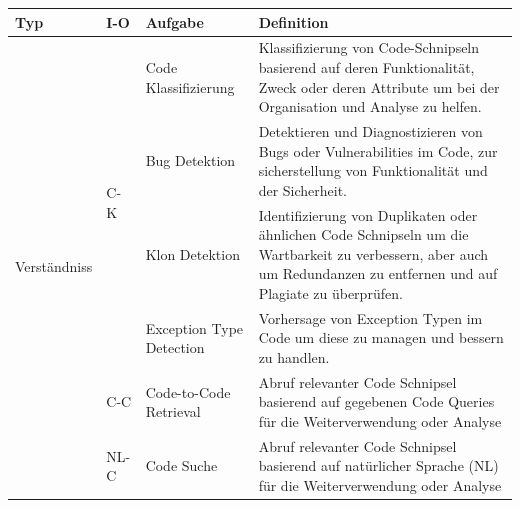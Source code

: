 \begin{table}[htbp]
    \centering
    \renewcommand{\arraystretch}{1.3} 
    
    \begin{tabular}{@{}lllp{8cm}@{}}
        \toprule
        \textbf{Typ} & \textbf{I-O} & \textbf{Aufgabe} & \textbf{Definition} \\
        \midrule
        
        \multirow{6}{*}{Verständniss} 
        & \multirow{4}{*}{C-K} 
        & Code Klassifizierung & Klassifizierung von Code-Schnipseln basierend auf deren Funktionalität, Zweck oder deren Attribute um bei der Organisation und Analyse zu helfen. \\
        & & Bug Detektion & Detektieren und Diagnostizieren von Bugs oder Vulnerabilities im Code, zur sicherstellung von Funktionalität und der Sicherheit. \\
        & & Klon Detektion & Identifizierung von Duplikaten oder ähnlichen Code Schnipseln um die Wartbarkeit zu verbessern, aber auch um Redundanzen zu entfernen und auf Plagiate zu überprüfen. \\
        & & Exception Type Detection & Vorhersage von Exception Typen im Code um diese zu managen und bessern zu handlen. \\
        \cmidrule{2-4}
        & C-C & Code-to-Code Retrieval & Abruf relevanter Code Schnipsel basierend auf gegebenen Code Queries für die Weiterverwendung oder Analyse \\
        \cmidrule{2-4}
        & NL-C & Code Suche & Abruf relevanter Code Schnipsel basierend auf natürlicher Sprache (NL) für die Weiterverwendung oder Analyse \\
        \midrule
        

\end{tabular}
\end{table}

